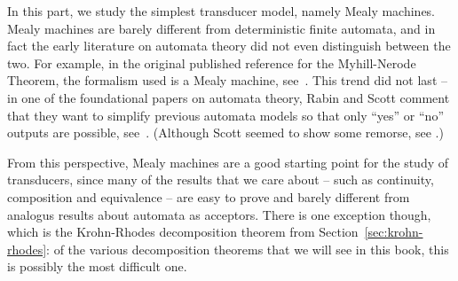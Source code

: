 In this part, we study the simplest transducer model, namely Mealy machines. Mealy machines are barely different from deterministic finite automata, and in fact the early literature on automata theory did not even distinguish between the two. For example, in the original published reference for the Myhill-Nerode Theorem, the formalism used is a Mealy machine, see~\cite[Lemma 2]{nerode1958}. This trend did not last -- 
in one of the foundational papers on automata theory, Rabin and Scott comment that they want to simplify previous automata models so that only ``yes'' or ``no'' outputs are possible, see~\cite[p.114]{RabinScott59}. (Although Scott seemed to show some remorse, see \cite[Sentence 3 in Section 5]{scott1967}.)

From this perspective, Mealy machines are a good starting point for the study of transducers, since many of the results that we care about -- such as continuity, composition and equivalence -- are easy to prove and barely different from analogus results about automata as acceptors.  There is one exception though, which is the Krohn-Rhodes decomposition theorem from Section~\ref{sec:krohn-rhodes}: of the various decomposition theorems that we will see in this book, this is possibly the most difficult one.